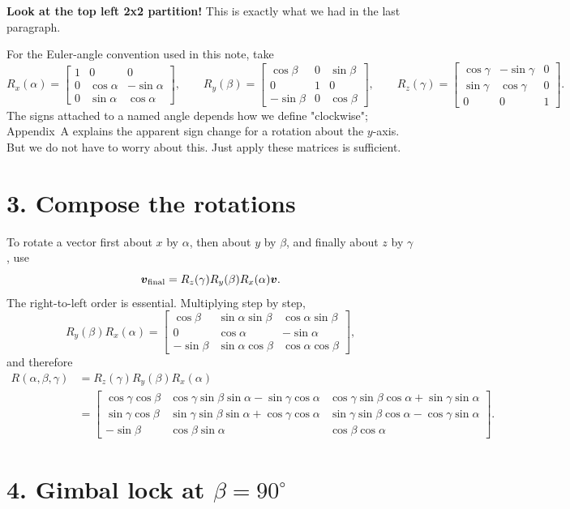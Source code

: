 \documentclass[10pt]{article}
\newcommand{\cA}{\cos\alpha}
\newcommand{\sA}{\sin\alpha}
\newcommand{\cB}{\cos\beta}
\newcommand{\sB}{\sin\beta}
\newcommand{\cG}{\cos\gamma}
\newcommand{\sG}{\sin\gamma}
\newcommand{\vect}[1]{\boldsymbol{#1}}
\begin{document}
\textbf{Look at the top left 2x2 partition!} This is exactly what we had in the last paragraph.

For the Euler-angle convention used in this note, take
\[
 R_x(\alpha)=
 \begin{bmatrix}1&0&0\\0&\cA&-\sA\\0&\sA&\cA\end{bmatrix},\qquad
 R_y(\beta)=
 \begin{bmatrix}\cB&0&\sB\\0&1&0\\-\sB&0&\cB\end{bmatrix},\qquad
 R_z(\gamma)=
 \begin{bmatrix}\cG&-\sG&0\\\sG&\cG&0\\0&0&1\end{bmatrix}.
\]
The signs attached to a named angle depends how we define "clockwise"; Appendix~A explains
the apparent sign change for a rotation about the $y$-axis. But we do not have to worry about this. Just apply these matrices is sufficient.

\section*{3. Compose the rotations}

To rotate a vector first about $x$ by $\alpha$, then about $y$ by $\beta$,
and finally about $z$ by $\gamma$, use
\[
 \vect v_{\rm final}=R_z(\gamma)R_y(\beta)R_x(\alpha)\vect v.
\]
The right-to-left order is essential.  Multiplying step by step,
\[
 R_y(\beta)R_x(\alpha)=
 \begin{bmatrix}
 \cB&\sA\sB&\cA\sB\\
 0&\cA&-\sA\\
 -\sB&\sA\cB&\cA\cB
 \end{bmatrix},
\]
and therefore
\[
\begin{aligned}
 R(\alpha,\beta,\gamma)
 &=R_z(\gamma)R_y(\beta)R_x(\alpha)\\[0.25em]
 &=\begin{bmatrix}
 \cG\cB & \cG\sB\sA-\sG\cA & \cG\sB\cA+\sG\sA\\
 \sG\cB & \sG\sB\sA+\cG\cA & \sG\sB\cA-\cG\sA\\
 -\sB & \cB\sA & \cB\cA
 \end{bmatrix}.
\end{aligned}
\]

\section*{4. Gimbal lock at $\beta=90^\circ$}
\end{document}
